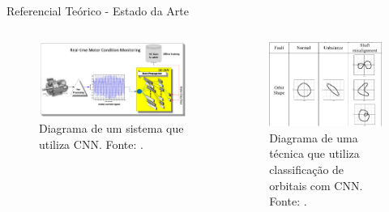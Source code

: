 \documentclass[aspectratio=169]{beamer}
\begin{document}

\begin{frame}{Referencial Teórico - Estado da Arte}
	\begin{columns}
    	\begin{column}{0.50\textwidth}
			\begin{figure}[HT]
				\begin{center}
					\includegraphics[scale=.25]{../referencial/img/cnn_ince_p2.png}
					\caption{Diagrama de um sistema que utiliza CNN. \newline
					Fonte: .} 
					\label{fig:cnn_ince_p2}
				\end{center}
			\end{figure}
     	\end{column}
		
		\begin{column}{0.5\textwidth}
			\begin{figure}[HT]
				\begin{center}
					\includegraphics[scale=.25]{../referencial/img/orbit_jeong_p3.png}
					\caption{Diagrama de uma técnica que \newline 
					utiliza classificação de orbitais com \newline
					CNN. \newline
					Fonte: .} 
					\label{fig:orbit_jeong_p3}
				\end{center}
			\end{figure}	
	 	\end{column}
	 \end{columns}
\end{frame}
\end{document}
